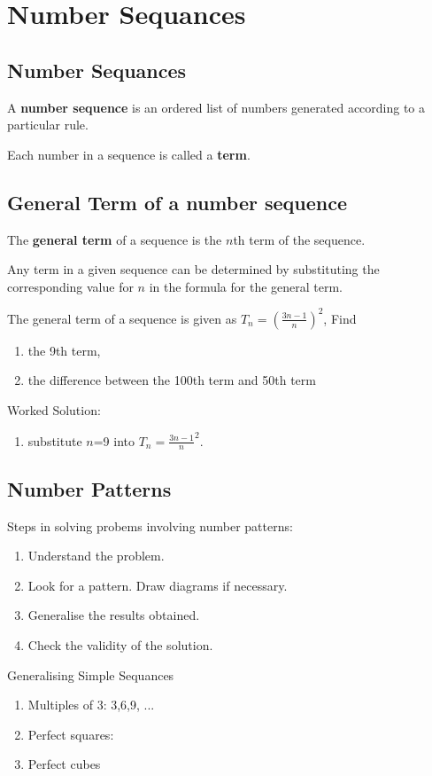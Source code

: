 \documentclass[../main]{subfiles}
\begin{document}
\section{Number Sequances}
\subsection{Number Sequances}
A \textbf{number sequence} is an ordered list of numbers generated according to
a particular rule.

Each number in a sequence is called a \textbf{term}.

\subsection{General Term of a number sequence}
The \textbf{general term} of a sequence is the $n$th term of the sequence.

Any term in a given sequence can be determined by substituting the corresponding
value for $n$ in the formula for the general term.

The general term of a sequence is given as \(T_n=(\frac {3n-1} n)^2\), Find
\begin{enumerate}[label=(\alph{*})]
\item the 9th term,
 
\item the difference between the 100th term and 50th term 
\end{enumerate}

Worked Solution:
\begin{enumerate}[label=(\alph{*})]
\item substitute $n$=9 into \(T_n={\frac {3n-1} n}^2\).
\end{enumerate}

\subsection{Number Patterns}
Steps in solving probems involving number patterns:
\begin{enumerate}[label=(\alph{*})]
\item Understand the problem.
\item Look for a pattern. Draw diagrams if necessary.  
\item Generalise the results obtained.
\item Check the validity of the solution.
\end{enumerate}

Generalising Simple Sequances
\begin{enumerate}
\item Multiples of 3: 3,6,9, ...
\item Perfect squares:  
\item Perfect cubes
\end{enumerate}
\end{document}
